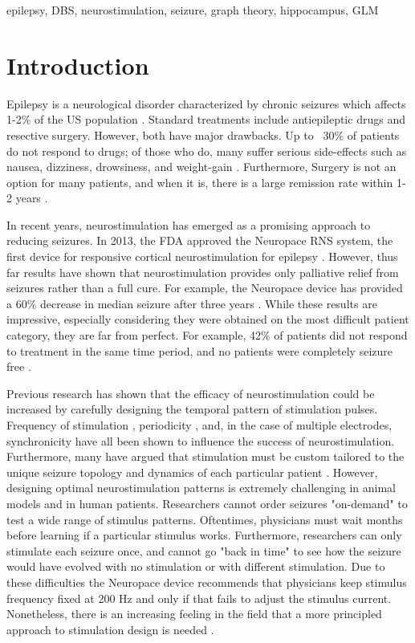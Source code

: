 \documentclass[journal,twoside,web]{ieeecolor}
\begin{document}
\begin{IEEEkeywords}
epilepsy, DBS, neurostimulation, seizure, graph theory, hippocampus, GLM
\end{IEEEkeywords}

\section{Introduction}
\label{sec:introduction}
Epilepsy is a neurological disorder characterized by chronic seizures which affects 1-2\% of the US population \cite{begley00}.
Standard treatments include antiepileptic drugs and resective surgery.
However, both have major drawbacks.
Up to ~30\% of patients do not respond to drugs; of those who do, many suffer serious side-effects such as nausea, dizziness, drowsiness, and weight-gain \cite{brodie96}.
Furthermore, Surgery is not an option for many patients, and when it is, there is a large remission rate within 1-2 years  \cite{engel03}.

In recent years, neurostimulation has emerged as a promising approach to reducing seizures.
In 2013, the FDA approved the Neuropace RNS system, the first device for responsive cortical neurostimulation for epilepsy \cite{sun08}.
However, thus far results have shown that neurostimulation provides only palliative relief from seizures rather than a full cure.
For example, the Neuropace device has provided a 60\% decrease in median seizure after three years  \cite{bergey15,morrell16}.
While these results are impressive, especially considering they were obtained on the most difficult patient category, they are far from perfect.
For example, 42\% of patients did not respond to treatment in the same time period, and no patients were completely seizure free \cite{bergey15}.

Previous research has shown that the efficacy of neurostimulation could be increased by carefully designing the temporal pattern of stimulation pulses.
Frequency of stimulation \cite{chkhenkeli97,cordeiro13}, periodicity \cite{wyckhuys10,buffel14}, and, in the case of multiple electrodes, synchronicity \cite{nelson11,van14} have all been shown to influence the success of neurostimulation.
Furthermore, many have argued that stimulation must be custom tailored to the unique seizure topology and dynamics of each particular patient \cite{holt14,wendling13, taylor15}.
However, designing optimal neurostimulation patterns is extremely challenging in animal models and in human patients.
Researchers cannot order seizures "on-demand" to test a wide range of stimulus patterns.
Oftentimes, physicians must wait months before learning if a particular stimulus works.
Furthermore, researchers can only stimulate each seizure once, and cannot go "back in time" to see how the seizure would have evolved with no stimulation or with different stimulation.
Due to these difficulties the Neuropace device recommends that physicians keep stimulus frequency fixed at 200 Hz and only if that fails to adjust the stimulus current.
Nonetheless, there is an increasing feeling in the field that a more principled approach to stimulation design is needed \cite{netoff15}.
\end{document}
